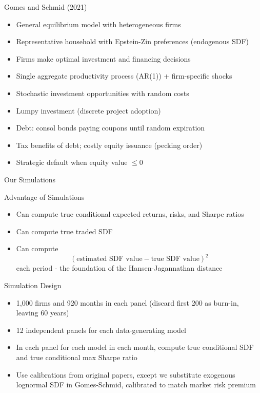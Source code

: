 \documentclass[aspectratio=169]{beamer}
\begin{document}
\begin{frame}{Gomes and Schmid (2021)}
\begin{itemize}
  \item General equilibrium model with heterogeneous firms
  \item Representative household with Epstein-Zin preferences (endogenous SDF)
  \item Firms make optimal investment and financing decisions
  \item Single aggregate productivity process (AR(1)) + firm-specific shocks
  \item Stochastic investment opportunities with random costs
  \item Lumpy investment (discrete project adoption)
  \item Debt: consol bonds paying coupons until random expiration
  \item Tax benefits of debt; costly equity issuance (pecking order)
  \item Strategic default when equity value $\leq 0$
\end{itemize}
\end{frame}


\begin{frame}[c]
  \centering
  \Huge Our Simulations
\end{frame}

\begin{frame}{Advantage of Simulations}
  \begin{itemize}
  \item Can compute true conditional expected returns, risks, and Sharpe ratios
  \item Can compute true traded SDF
  \item Can compute 
  $$(\text{estimated SDF value}-\text{true SDF value})^2$$
   each period - the foundation of the Hansen-Jagannathan distance
  \end{itemize}

\end{frame}

\begin{frame}{Simulation Design}
\begin{itemize}
  \item 1,000 firms and 920 months in each panel (discard first 200 as burn-in, leaving 60 years)
  \item 12 independent panels for each data-generating model
  \item In each panel for each model in each month, compute true conditional SDF and true conditional max Sharpe ratio
  \item Use calibrations from original papers, except we substitute exogenous lognormal SDF in Gomes-Schmid, calibrated to match market risk premium
\end{itemize}
\end{frame}
\end{document}

